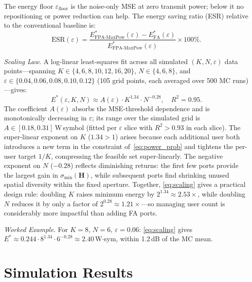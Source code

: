\documentclass[journal,letterpaper,10pt,twocolumn]{IEEEtran}
\begin{document}
The energy floor $\varepsilon_{\text{floor}}$ is the noise-only MSE at
zero transmit power; below it no repositioning or power reduction can
help. The energy saving ratio (ESR) relative to the conventional
baseline is:
\begin{equation}
  \text{ESR}(\varepsilon) =
  \frac{E^{*}_{\text{FPA-MaxPow}}(\varepsilon)-E^{*}_{\text{FA}}(\varepsilon)}
       {E^{*}_{\text{FPA-MaxPow}}(\varepsilon)}\times 100\%.
  \label{eq:esr}
\end{equation}

\textit{Scaling Law.} A log-linear least-squares fit across all
simulated $(K,N,\varepsilon)$ data points---spanning $K\!\in\!\{4,6,8,10,12,16,20\}$,
$N\!\in\!\{4,6,8\}$, and $\varepsilon\!\in\!\{0.04,0.06,0.08,0.10,0.12\}$
(105 grid points, each averaged over 500 MC runs)---gives:
\begin{equation}
  E^{*}(\varepsilon,K,N)\approx A(\varepsilon)\cdot K^{1.34}\cdot N^{-0.28},
  \quad R^{2}=0.95.
  \label{eq:scaling}
\end{equation}
The coefficient $A(\varepsilon)$ absorbs the MSE-threshold dependence
and is monotonically decreasing in $\varepsilon$; its range over the
simulated grid is $A\!\in\![0.18,0.31]$\,W\,symbol (fitted per
$\varepsilon$ slice with $R^{2}\!>\!0.93$ in each slice). The
super-linear exponent on $K$ ($1.34\!>\!1$) arises because each
additional user both introduces a new term in the constraint
of~\eqref{eq:power_prob} and tightens the per-user target $1/K$,
compressing the feasible set super-linearly. The negative exponent on
$N$ ($-0.28$) reflects diminishing returns: the first few ports
provide the largest gain in $\sigma_{\min}(\mathbf{H})$, while
subsequent ports find shrinking unused spatial diversity within the
fixed aperture. Together, \eqref{eq:scaling} gives a practical design
rule: doubling $K$ raises minimum energy by $2^{1.34}\approx 2.53\times$,
while doubling $N$ reduces it by only a factor of $2^{0.28}\approx 1.21\times$---so
managing user count is considerably more impactful than adding FA ports.

\textit{Worked Example.} For $K\!=\!8$, $N\!=\!6$,
$\varepsilon\!=\!0.06$: \eqref{eq:scaling} gives
$E^{*}\approx 0.244\cdot 8^{1.34}\cdot 6^{-0.28}\approx 2.40$\,W$\cdot$sym,
within 1.2\,dB of the MC mean.

\section{Simulation Results}
\end{document}
